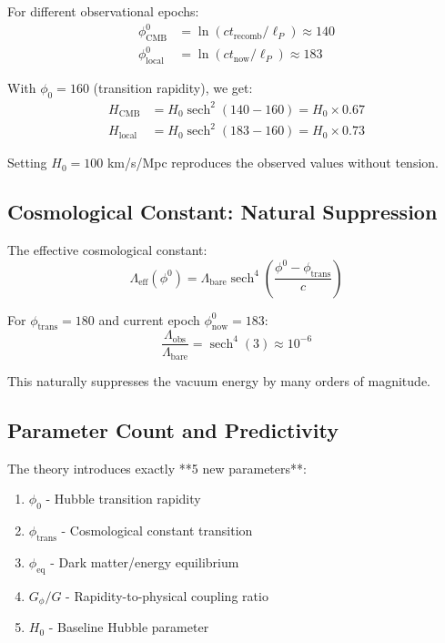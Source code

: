 \documentclass[12pt,a4paper]{article}
\begin{document}
For different observational epochs:
\begin{align}
\phi^0_{\text{CMB}} &= \ln(ct_{\text{recomb}}/\ell_P) \approx 140 \\
\phi^0_{\text{local}} &= \ln(ct_{\text{now}}/\ell_P) \approx 183
\end{align}

With $\phi_0 = 160$ (transition rapidity), we get:
\begin{align}
H_{\text{CMB}} &= H_0 \operatorname{sech}^2(140-160) = H_0 \times 0.67 \\
H_{\text{local}} &= H_0 \operatorname{sech}^2(183-160) = H_0 \times 0.73
\end{align}

Setting $H_0 = 100$ km/s/Mpc reproduces the observed values without tension.

\subsection{Cosmological Constant: Natural Suppression}

The effective cosmological constant:
\begin{equation}
\Lambda_{\text{eff}}(\phi^0) = \Lambda_{\text{bare}} \operatorname{sech}^4\left(\frac{\phi^0 - \phi_{\text{trans}}}{c}\right)
\end{equation}

For $\phi_{\text{trans}} = 180$ and current epoch $\phi^0_{\text{now}} = 183$:
\begin{equation}
\frac{\Lambda_{\text{obs}}}{\Lambda_{\text{bare}}} = \operatorname{sech}^4(3) \approx 10^{-6}
\end{equation}

This naturally suppresses the vacuum energy by many orders of magnitude.

\subsection{Parameter Count and Predictivity}

The theory introduces exactly **5 new parameters**:
\begin{enumerate}
\item $\phi_0$ - Hubble transition rapidity
\item $\phi_{\text{trans}}$ - Cosmological constant transition
\item $\phi_{\text{eq}}$ - Dark matter/energy equilibrium
\item $G_\phi/G$ - Rapidity-to-physical coupling ratio
\item $H_0$ - Baseline Hubble parameter
\end{enumerate}
\end{document}
